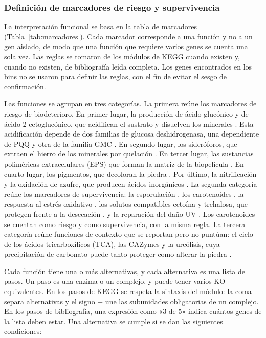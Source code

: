 \subsubsection{Definición de marcadores de riesgo y supervivencia}
\begin{nuevo}
La interpretación funcional se basa en la tabla de marcadores
(Tabla~\ref{tab:marcadores}). Cada marcador corresponde a una función y no a un
gen aislado, de modo que una función que requiere varios genes se cuenta una
sola vez. Las reglas se tomaron de los módulos de KEGG \cite{kegg2023} cuando
existen y, cuando no existen, de bibliografía leída completa. Los genes
encontrados en los bins no se usaron para definir las reglas, con el fin de
evitar el sesgo de confirmación.

Las funciones se agrupan en tres categorías. La primera reúne los marcadores de
riesgo de biodeterioro. En primer lugar, la producción de ácido glucónico y de
ácido 2-cetoglucónico, que acidifican el sustrato y disuelven los minerales
\cite{uroz2026}. Esta acidificación depende de dos familias de glucosa
deshidrogenasa, una dependiente de PQQ y otra de la familia GMC
\cite{picard2021, blanconouche2024}. En segundo lugar, los sideróforos, que
extraen el hierro de los minerales por quelación
\cite{blanconouche2023, dalvie2026}. En tercer lugar, las sustancias
poliméricas extracelulares (EPS) que forman la matriz de la biopelícula
\cite{flemming2010, arnaouteli2021}. En cuarto lugar, los pigmentos, que
decoloran la piedra \cite{basile2025, gaylarde2021}. Por último, la
nitrificación y la oxidación de azufre, que producen ácidos inorgánicos
\cite{dakal2012, zanardini2019}. La segunda categoría reúne los marcadores de
supervivencia: la esporulación \cite{Galperin2022}, los carotenoides
\cite{basile2025, santanamolina2022}, la respuesta al estrés oxidativo
\cite{imlay2013}, los solutos compatibles ectoína y trehalosa, que protegen
frente a la desecación \cite{alonsoreyes2021, elistratova2026, laskowska2020},
y la reparación del daño UV \cite{goosen2008}. Los carotenoides se cuentan como
riesgo y como supervivencia, con la misma regla. La tercera categoría reúne
funciones de contexto que se reportan pero no puntúan: el ciclo de los ácidos
tricarboxílicos (TCA), las CAZymes \cite{cantarel2009, zhang2018} y la
ureólisis, cuya precipitación de carbonato puede tanto proteger como alterar la
piedra \cite{dhami2013, li2018}.

Cada función tiene una o más alternativas, y cada alternativa es una lista de
pasos. Un paso es una enzima o un complejo, y puede tener varios KO
equivalentes. En los pasos de KEGG se respeta la sintaxis del módulo: la coma
separa alternativas y el signo + une las subunidades obligatorias de un
complejo. En los pasos de bibliografía, una expresión como «3 de 5» indica
cuántos genes de la lista deben estar. Una alternativa se cumple si se dan las
siguientes condiciones:


\end{nuevo}
